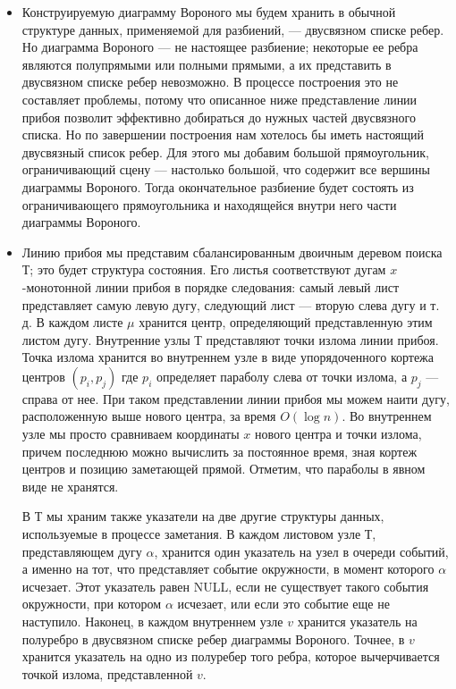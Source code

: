 \begin{itemize}
	\item Конструируемую  диаграмму  Вороного  мы  будем хранить  в  обычной  структуре  данных,  применяемой  для  разбиений, --- двусвязном  списке  ребер.
	Но  диаграмма  Вороного --- не  настоящее  разбиение;  некоторые  ее ребра  являются  полупрямыми  или  полными  прямыми,  а  их  представить  в  двусвязном  списке  ребер невозможно.
	В  процессе  построения  это  не  составляет  проблемы,  потому что  описанное  ниже  представление  линии  прибоя  позволит  эффективно добираться  до  нужных  частей  двусвязного  списка.
	Но  по  завершении  построения  нам  хотелось  бы  иметь  настоящий  двусвязный  список  ребер.
	Для этого  мы  добавим  большой  прямоугольник,  ограничивающий  сцену --- настолько  большой,  что  содержит  все  вершины  диаграммы  Вороного.
	Тогда окончательное  разбиение  будет  состоять  из  ограничивающего  прямоугольника  и  находящейся  внутри  него  части  диаграммы  Вороного.
	
	\item Линию  прибоя  мы  представим  сбалансированным  двоичным  деревом  поиска  Т;  это  будет  структура  состояния.
	Его  листья  соответствуют  дугам $x$-монотонной  линии  прибоя  в  порядке  следования:  самый  левый  лист представляет  самую  левую  дугу,  следующий  лист  ---  вторую  слева  дугу  и  т.  д. 
	В  каждом  листе  $\mu$  хранится  центр,  определяющий  представленную  этим  листом  дугу.
	Внутренние  узлы  Т  представляют  точки  излома  линии  прибоя. 
	Точка  излома  хранится  во  внутреннем  узле  в  виде  упорядоченного  кортежа центров $(p_i, p_j)$ где $p_i$ определяет  параболу  слева  от  точки  излома,  а $p_j$ --- справа  от  нее.
	При  таком  представлении  линии  прибоя  мы  можем  наити  дугу, расположенную  выше  нового  центра,  за  время $O(\log n)$.
	Во  внутреннем  узле мы  просто  сравниваем  координаты  $x$  нового  центра  и  точки  излома,  причем последнюю  можно  вычислить  за  постоянное  время,  зная  кортеж  центров и  позицию  заметающей  прямой.
	Отметим,  что  параболы  в  явном  виде  не хранятся.
	
	В Т  мы  храним  также  указатели  на  две  другие  структуры  данных,  используемые  в  процессе  заметания.
	В  каждом  листовом  узле  Т,  представляющем дугу  $\alpha$,  хранится  один  указатель  на  узел  в  очереди  событий,  а  именно  на тот,  что  представляет  событие  окружности,  в  момент  которого  $\alpha$  исчезает. 
	Этот  указатель  равен  NULL,  если  не  существует  такого  события  окружности, при  котором  $\alpha$  исчезает,  или  если  это  событие  еще  не  наступило.
	Наконец, в  каждом  внутреннем  узле  $v$  хранится  указатель  на  полуребро  в  двусвязном списке  ребер  диаграммы  Вороного.
	Точнее,  в  $v$  хранится  указатель  на  одно из  полуребер  того  ребра,  которое  вычерчивается  точкой  излома,  представленной $v$.
	

\end{itemize}

